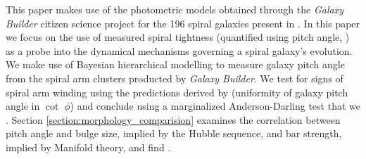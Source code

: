 This paper makes use of the photometric models obtained through the \textit{Galaxy Builder} citizen science project for the 196 spiral galaxies present in . In this paper we focus on the use of measured spiral tightness (quantified using pitch angle, \citealt{1987gady.book.....B}) as a probe into the dynamical mechanisms governing a spiral galaxy's evolution. We make use of Bayesian hierarchical modelling to measure galaxy pitch angle from the spiral arm clusters producted by \textit{Galaxy Builder}. We test for signs of spiral arm winding using the predictions derived by \citealt{2019arXiv190910291P} (uniformity of galaxy pitch angle in $\cot\;\phi$) and conclude using a marginalized Anderson-Darling test that we . Section \ref{section:morphology_comparision} examines the correlation between pitch angle and bulge size, implied by the Hubble sequence, and bar strength, implied by Manifold theory, and find .
